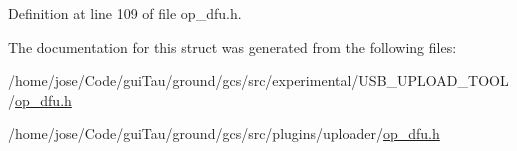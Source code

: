 Definition at line 109 of file op\-\_\-dfu.\-h.



The documentation for this struct was generated from the following files\-:\begin{DoxyCompactItemize}
\item 
/home/jose/\-Code/gui\-Tau/ground/gcs/src/experimental/\-U\-S\-B\-\_\-\-U\-P\-L\-O\-A\-D\-\_\-\-T\-O\-O\-L/\hyperlink{experimental_2_u_s_b___u_p_l_o_a_d___t_o_o_l_2op__dfu_8h}{op\-\_\-dfu.\-h}\item 
/home/jose/\-Code/gui\-Tau/ground/gcs/src/plugins/uploader/\hyperlink{plugins_2uploader_2op__dfu_8h}{op\-\_\-dfu.\-h}\end{DoxyCompactItemize}
